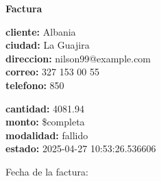 \documentclass{article}
\begin{document}
\begin{center}
    {\LARGE \textbf{Factura}}\\[1cm]
\end{center}

\textbf{cliente:} Albania \\
\textbf{ciudad:} La Guajira \\
\textbf{direccion:} nilson99@example.com \\
\textbf{correo:} 327 153 00 55 \\
\textbf{telefono:} 850 \\

\vspace{0.5cm}

\textbf{cantidad:} 4081.94 \\
\textbf{monto:} \$completa \\
\textbf{modalidad:} fallido \\
\textbf{estado:} 2025-04-27 10:53:26.536606 \\

\vspace{1cm}

Fecha de la factura: 
\end{document}

